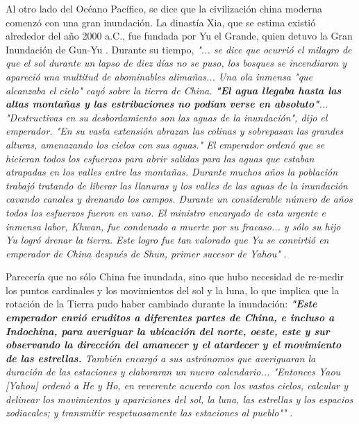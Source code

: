 \documentclass[10pt,twocolumn,letterpaper]{article}
\begin{document}
Al otro lado del Océano Pacífico, se dice que la civilización china moderna comenzó con una gran inundación. La dinastía Xia, que se estima existió alrededor del año 2000 a.C., fue fundada por Yu el Grande, quien detuvo la Gran Inundación de Gun-Yu \cite{6}. Durante su tiempo, \textit{"... se dice que ocurrió el milagro de que el sol durante un lapso de diez días no se puso, los bosques se incendiaron y apareció una multitud de abominables alimañas... Una ola inmensa "que alcanzaba el cielo" cayó sobre la tierra de China. \textbf{"El agua llegaba hasta las altas montañas y las estribaciones no podían verse en absoluto"}... "Destructivas en su desbordamiento son las aguas de la inundación", dijo el emperador. "En su vasta extensión abrazan las colinas y sobrepasan las grandes alturas, amenazando los cielos con sus aguas." El emperador ordenó que se hicieran todos los esfuerzos para abrir salidas para las aguas que estaban atrapadas en los valles entre las montañas. Durante muchos años la población trabajó tratando de liberar las llanuras y los valles de las aguas de la inundación cavando canales y drenando los campos. Durante un considerable número de años todos los esfuerzos fueron en vano. El ministro encargado de esta urgente e inmensa labor, Khwan, fue condenado a muerte por su fracaso... y sólo su hijo Yu logró drenar la tierra. Este logro fue tan valorado que Yu se convirtió en emperador de China después de Shun, primer sucesor de Yahou"} \cite{5}.

Parecería que no sólo China fue inundada, sino que hubo necesidad de re-medir los puntos cardinales y los movimientos del sol y la luna, lo que implica que la rotación de la Tierra pudo haber cambiado durante la inundación: \textit{\textbf{"Este emperador envió eruditos a diferentes partes de China, e incluso a Indochina, para averiguar la ubicación del norte, oeste, este y sur observando la dirección del amanecer y el atardecer y el movimiento de las estrellas.} También encargó a sus astrónomos que averiguaran la duración de las estaciones y elaboraran un nuevo calendario... "Entonces Yaou [Yahou] ordenó a He y Ho, en reverente acuerdo con los vastos cielos, calcular y delinear los movimientos y apariciones del sol, la luna, las estrellas y los espacios zodiacales; y transmitir respetuosamente las estaciones al pueblo""} \cite{5}.
\end{document}
